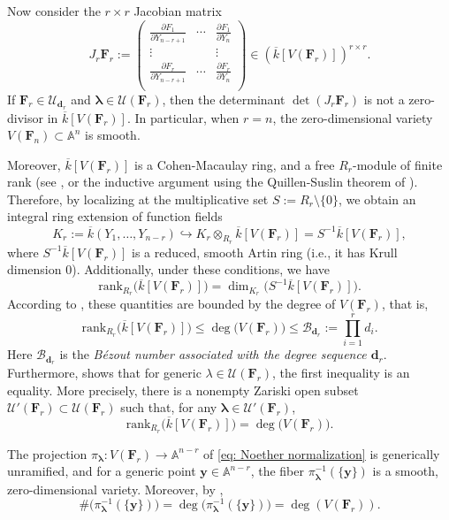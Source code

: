 \documentclass[pdflatex,sn-basic]{sn-jnl}%
\theoremstyle{thmstyleone}%
\theoremstyle{thmstyletwo}%
\theoremstyle{thmstylethree}%
\theoremstyle{definition}
\numberwithin{equation}{section}
\newcommand{\bfs}{\boldsymbol}
\newcommand{\A}{\mathbb A}
\begin{document}
Now consider the $r\times r$ Jacobian matrix
%
$$J_r\bfs F_r:=\left(
               \begin{array}{ccc}
                 \frac{\partial F_1}{\partial Y_{n-r+1}} & \cdots & \frac{\partial F_1}{\partial Y_n} \\
                 \vdots &  & \vdots \\
                 \frac{\partial F_r}{\partial Y_{n-r+1}} & \cdots & \frac{\partial F_r}{\partial Y_n} \\
               \end{array}
             \right)\in(\overline{k}[V(\bfs F_r)])^{r\times r}.
$$
%
If $\bfs F_r\in\mathcal{U}_{\bfs d_r}$ and
$\bfs\lambda\in\mathcal{U}(\bfs F_r)$, then the determinant
$\det(J_r\bfs F_r)$ is not a zero-divisor in $\overline{k}[V(\bfs
F_r)]$. In particular, when $r=n$, the zero-dimensional variety
$V(\bfs F_n)\subset \A^n$ is smooth.

Moreover, $\overline{k}[V(\bfs F_r)]$ is a Cohen-Macaulay ring, and
a free $R_r$-module of finite rank (see \cite{Iversen73}, or the
inductive argument using the Quillen-Suslin theorem of
\cite{GiHeSa93}). Therefore, by localizing at the multiplicative
set $S:=R_r\setminus\{0\}$, we obtain an integral
ring extension of function fields
%
$$K_r:=\overline{k}(Y_1,\ldots,Y_{n-r})\hookrightarrow K_r
\otimes_{R_r}\overline{k}[V(\bfs
F_r)]=S^{-1}\overline{k}[V(\bfs F_r)],$$
%
where $S^{-1}\overline{k}[V(\bfs F_r)]$ is a reduced, smooth Artin
ring (i.e., it has Krull dimension 0). Additionally, under these
conditions, we have
%
$$\mathrm{rank}_{R_r}\big(\overline{k}
[V(\bfs F_r)]\big)=\dim_{K_r}\big(
S^{-1}\overline{k}[V(\bfs F_r)]\big).$$
%
According to \cite{Heintz83}, these quantities are bounded by the
degree of $V(\bfs F_r)$, that is,
%
$$\mathrm{rank}_{R_r}\big(\overline{k}
[V(\bfs F_r)]\big)\le \deg\big(V(\bfs F_r)\big)\le \mathcal{B}_{\bfs
d_r}:=\prod_{i=1}^rd_i.$$
%
Here $\mathcal{B}_{\bfs d_r}$ is the {\em B\'ezout number associated
with the degree sequence $\bfs d_r$}. Furthermore,
\cite{Heintz83} shows that for generic $\lambda\in\mathcal{U}(\bfs F_r)$, the
first inequality is an equality. More precisely, there is a nonempty
Zariski open subset $\mathcal{U}'(\bfs F_r)\subset \mathcal{U}(\bfs
F_r)$ such that, for any $\bfs\lambda\in \mathcal{U}'(\bfs F_r)$,
%
$$\mathrm{rank}_{R_r}\big(\overline{k}
[V(\bfs F_r)]\big)=\deg\big(V(\bfs F_r)\big).$$

The projection $\pi_{\bfs\lambda}:V(\bfs F_r)\to\A^{n-r}$ of
\eqref{eq: Noether normalization} is generically unramified, and for
a generic point $\bfs y\in\A^{n-r}$, the fiber
$\pi_{\bfs\lambda}^{-1}(\{\bfs y\})$  is a smooth, zero-dimensional
variety. Moreover, by \cite{Heintz83},
%
$$\#\big(\pi_{\bfs\lambda}^{-1}(\{\bfs y\})\big)=
\deg\big(\pi_{\bfs\lambda}^{-1}(\{\bfs y\})\big)=\deg (V(\bfs F_r)).$$
\end{document}

